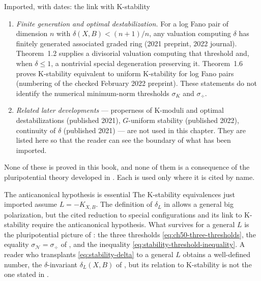 \begin{important}{Imported, with dates: the link with K-stability}
\begin{enumerate}
       whenever the Green function of $v$ is
      $\mathbf Q$-PL, and in general from \cite{Fuj19}.
\item\label{itm:ch50-fano:lxz}
      \emph{Finite generation and optimal destabilization.}
      For a log Fano pair of dimension $n$ with
      $\delta(X,B)<(n+1)/n$, any valuation computing $\delta$ has
      finitely generated associated graded ring
      \cite[Theorem~1.1]{LXZ22} (2021 preprint, 2022 journal).
      Theorem~1.2 supplies a divisorial valuation computing that threshold
      and, when $\delta\le1$, a nontrivial special degeneration
      preserving it.  Theorem~1.6 proves K-stability equivalent to
      uniform K-stability for log Fano pairs (numbering of the checked
      February 2022 preprint).  These statements do not
      identify the numerical minimum-norm thresholds
      $\sigma_K$ and $\sigma_{\div}$.
\item\label{itm:ch50-fano:openness}
      \emph{Related later developments} --- properness of K-moduli and
      optimal destabilizations \cite{BHLLX21} (published 2021),
      $G$-uniform stability \cite{Li22} (published 2022), continuity of
      $\delta$ \cite{Zhang21} (published 2021) --- are not used in this
      chapter.  They are listed here so that the reader can see the
      boundary of what has been imported.
\end{enumerate}
None of these is proved in this book, and none of them is a consequence of
the pluripotential theory developed in .  Each is used only
where it is cited by name.
\end{important}

\begin{warning}{The anticanonical hypothesis is essential}
\label{warn:ch50-anticanonical-essential}
The K-stability equivalences just imported assume $L=-K_{X,B}$.
The definition of $\delta_L$ in \cite{BJ20} allows a general big
polarization, but the cited reduction to special configurations and its
link to K-stability require the anticanonical hypothesis.
What survives for
a general $L$ is the pluripotential picture of
: the three thresholds
\eqref{eq:ch50-three-thresholds}, the equality
$\sigma_{\mathcal N}=\sigma_{\div}$ of
, and the inequality
\eqref{eq:stability-threshold-inequality}.  A reader who transplants
\eqref{eq:stability-delta} to a general $L$ obtains a well-defined
number, the $\delta$-invariant $\delta_L(X,B)$ of \cite{BJ20}, but its
relation to K-stability is not the one stated in
.
\end{warning}

